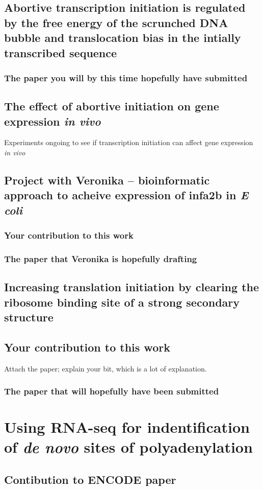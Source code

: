 \documentclass[b5paper]{report}
\begin{document}
\chapter{Abortive transcription initiation is regulated by the free energy of
the scrunched DNA bubble and translocation bias in the intially transcribed
sequence}

\section{The paper you will by this time hopefully have submitted}

\chapter{The effect of abortive initiation on gene expression \textit{in vivo}}
Experiments ongoing to see if transcription initiation can affect gene
expression \textit{in vivo}

\chapter{Project with Veronika -- bioinformatic approach to acheive expression
of infa2b in \textit{E coli}}

\section{Your contribution to this work}

\section{The paper that Veronika is hopefully drafting}

\chapter{Increasing translation initiation by clearing the ribosome binding
site of a strong secondary structure}

\chapter{Your contribution to this work}
Attach the paper; explain your bit, which is a lot of explanation.

\section{The paper that will hopefully have been submitted}

\part{Using RNA-seq for indentification of \textit{de novo} sites of
polyadenylation}

\chapter{Contibution to ENCODE paper}
\end{document}

